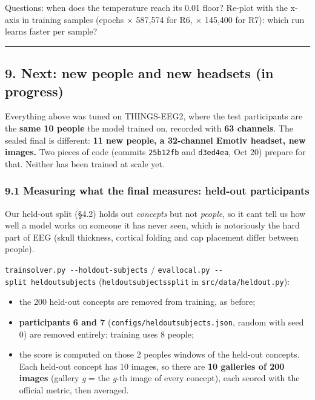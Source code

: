 \documentclass[
  11pt,
]{article}
\providecommand{\tightlist}{%
  \setlength{\itemsep}{0pt}\setlength{\parskip}{0pt}}
\renewcommand{\_}{\oldunderscore\allowbreak}
\begin{document}
Questions: when does the temperature
reach its 0.01 floor? Re-plot with the
x-axis in training samples (epochs ×
587,574 for R6, × 145,400 for R7): which
run learns faster per sample?

\begin{center}\rule{0.5\linewidth}{0.5pt}\end{center}

\subsection{9. Next: new people and new
headsets (in
progress)}\label{next-new-people-and-new-headsets-in-progress}

Everything above was tuned on
THINGS-EEG2, where the test participants
are the \textbf{same 10 people} the
model trained on, recorded with
\textbf{63 channels}. The sealed final
is different: \textbf{11 new people, a
32-channel Emotiv headset, new images.}
Two pieces of code (commits
\texttt{25b12fb} and \texttt{d3ed4ea},
Oct 20) prepare for that. Neither has
been trained at scale yet.

\subsubsection{9.1 Measuring what the
final measures: held-out
participants}\label{measuring-what-the-final-measures-held-out-participants}

Our held-out split (§4.2) holds out
\emph{concepts} but not \emph{people},
so it can\textquotesingle t tell us how
well a model works on someone it has
never seen, which is notoriously the
hard part of EEG (skull thickness,
cortical folding and cap placement
differ between people).

\texttt{train\_solver.py\ -\/-holdout-subjects}
/
\texttt{eval\_local.py\ -\/-split\ heldout\_subjects}
(\texttt{heldout\_subjects\_split} in
\texttt{src/data/heldout.py}):

\begin{itemize}
\tightlist
\item
  the 200 held-out concepts are removed
  from training, as before;
\item
  \textbf{participants 6 and 7}
  (\texttt{configs/heldout\_subjects.json},
  random with seed 0) are removed
  entirely: training uses 8 people;
\item
  the score is computed on those 2
  people\textquotesingle s windows of
  the held-out concepts. Each held-out
  concept has 10 images, so there are
  \textbf{10 galleries of 200 images}
  (gallery \emph{g} = the \emph{g}-th
  image of every concept), each scored
  with the official metric, then
  averaged.
\end{itemize}
\end{document}
